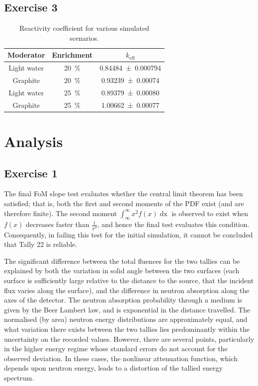 \documentclass{article}
\begin{document}
  \subsection{Exercise 3}
    \begin{table}[]
    \centering
    \caption{Reactivity coefficient for various simulated scenarios.}
    \label{table:reactivities}
    \begin{tabular}{@{}ccc@{}}
    \toprule
    Moderator & Enrichment & $k_{\text{eff}}$      \\ \midrule
    Light water        & \SI{20}{\percent} & \num{0.84484\pm0.000794}   \\
    Graphite           & \SI{20}{\percent} & \num{0.93239 \pm 0.00074} \\
    Light water        & \SI{25}{\percent} & \num{0.89379\pm 0.00080}  \\
    Graphite           & \SI{25}{\percent} & \num{1.00662 \pm 0.00077} \\ \bottomrule
    \end{tabular}
    \end{table}


\section{Analysis}
  \subsection{Exercise 1}
    The final FoM slope test evaluates whether the central limit theorem has been satisfied; that is, both the first and second moments of the PDF exist (and are therefore finite). The second moment $\int_{\infty}^{\infty}{x^2f(x)\operatorname{dx}}$ is observed to exist when $f(x)$ decreases faster than $\frac{1}{x^3}$, and hence the final test evaluates this condition. Consequently, in failing this test for the initial simulation, it cannot be concluded that Tally 22 is reliable.

    The significant difference between the total fluences for the two tallies can be explained by both the variation in solid angle between the two surfaces (each surface is sufficiently large relative to the distance to the source, that the incident flux varies along the surface), and the difference in neutron absorption along the axes of the detector. The neutron absorption probability through a medium is given by the Beer Lambert law, and is exponential in the distance travelled.
    The normalised (by area) neutron energy distributions are approximately equal, and what variation there exists between the two tallies lies predominantly within the uncertainty on the recorded values. However, there are several points, particularly in the higher energy regime whose standard errors do not account for the observed deviation. In these cases, the nonlinear attenuation function, which depends upon neutron energy, leads to a distortion of the tallied energy spectrum.
\end{document}
